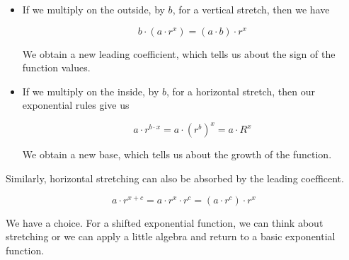 \documentclass{ximera}
\begin{document}
\begin{itemize}
\item If we multiply on the outside, by $b$, for a vertical stretch, then we have

\[
b \cdot (a \cdot r^x) = (a \cdot b) \cdot r^x
\]

We obtain a new leading coefficient, which tells us about the sign of the function values. \\






\item If we multiply on the inside, by $b$, for a horizontal stretch, then our exponential rules give us

\[
a \cdot r^{b \cdot x} = a \cdot (r^b)^x = a \cdot R^x
\]

We obtain a new base, which tells us about the growth of the function.


\end{itemize}





Similarly, horizontal stretching can also be absorbed by the leading coefficent.

 \[
 a \cdot r^{x+c} = a \cdot r^x \cdot r^c = (a \cdot r^c) \cdot r^x
\]




We have a choice.  For a shifted exponential function, we can think about stretching or we can apply a little algebra and return to a basic exponential function.
\end{document}
